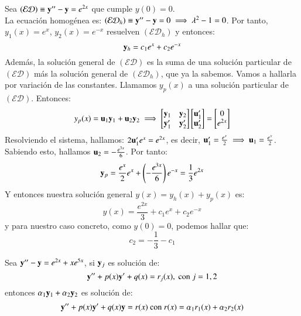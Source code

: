 \begin{eg}
    Sea $(\mathcal{ED}) \equiv \mathbf{y}'' - \mathbf{y} = e^{2x}$ que cumple $y(0) = 0$.\\
    La ecuación homogénea es: $(\mathcal{ED}_h) \equiv \mathbf{y}'' - \mathbf{y} = 0 \implies \lambda^2 -1 = 0$. Por tanto, $y_1(x) = e^x$, $y_2(x) = e^{-x}$ resuelven $(\mathcal{ED}_h)$ y entonces:
    $$
        \mathbf{y}_h = c_1 e^x + c_2 e^{-x}
    $$
    Además, la solución general de $(\mathcal{ED})$ es la suma de una solución particular de $(\mathcal{ED})$ más la solución general de $(\mathcal{ED}_h)$, que ya la sabemos. Vamos a hallarla por variación de las constantes. Llamamos $y_p(x)$ a una solución particular de $(\mathcal{ED})$. Entonces:
    $$
        y_p(x) = \mathbf{u}_1 \mathbf{y}_1 + \mathbf{u}_2 \mathbf{y}_2 \implies
        \left[
        \begin{matrix}
            \mathbf{y}_1 & \mathbf{y}_2\\
            \mathbf{y}_1' & \mathbf{y}_2'
        \end{matrix}
        \right]
        \left[
        \begin{matrix}
            \mathbf{u}'_1\\
            \mathbf{u}'_2
        \end{matrix}
        \right] =
        \left[
        \begin{matrix}
            0\\
            e^{2x}
        \end{matrix}
        \right]
    $$
    Resolviendo el sistema, hallamos: $2 \mathbf{u}'_1 e^x = e^{2x}$, es decir, $\mathbf{u}'_1 = \frac{e^x}{2} \implies \mathbf{u}_1= \frac{e^x}{2}$. Sabiendo esto, hallamos $\mathbf{u}_2 = -\frac{e^{3x}}{6}$. Por tanto:
    $$
        \mathbf{y}_p = \frac{e^x}{2} e^x + \left(-\frac{e^{3x}}{6}\right)e^{-x} = \frac{1}{3} e^{2x}
    $$
    Y entonces nuestra solución general $y(x) = y_h(x) + y_p(x)$ es:
    $$
        y(x) = \frac{e^{2x}}{3} + c_1 e^x + c_2 e^{-x}
    $$
    y para nuestro caso concreto, como $y(0)=0$, podemos hallar que:
    $$
        c_2 = -\frac{1}{3} - c_1
    $$
\end{eg}

\begin{obs}
    Sea $\mathbf{y}'' - \mathbf{y} = e^{2x} + x e^{5x}$, si $\mathbf{y}_j$ es solución de:
    $$
        \mathbf{y}'' + p(x) \mathbf{y}' + q(x) = r_j(x), \text{ con } j=1,2
    $$
    entonces $\alpha_1 \mathbf{y}_1 + \alpha_2 \mathbf{y}_2$ es solución de:
    $$
        \mathbf{y}'' + p(x) \mathbf{y}' + q(x) \mathbf{y} = r(x) \text{ con } r(x) = \alpha_1 r_1(x) + \alpha_2 r_2(x)
    $$
\end{obs}

